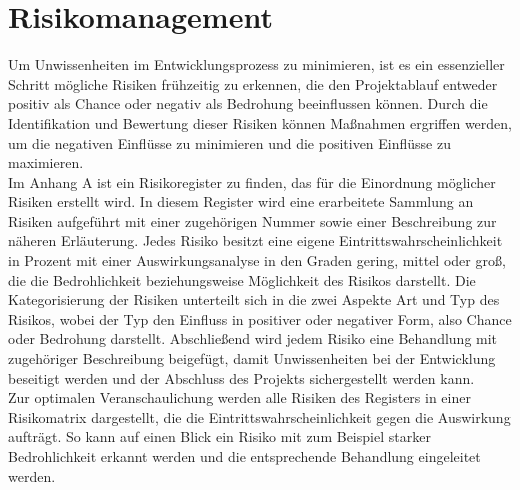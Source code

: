 \chapter{Risikomanagement}\label{ch:risikomanagement}
Um Unwissenheiten im Entwicklungsprozess zu minimieren, ist es ein essenzieller Schritt mögliche Risiken frühzeitig 
zu erkennen, die den Projektablauf entweder positiv als Chance oder negativ als Bedrohung beeinflussen können.
Durch die Identifikation und Bewertung dieser Risiken können Maßnahmen ergriffen werden, um die negativen
Einflüsse zu minimieren und die positiven Einflüsse zu maximieren. \\
\newline
Im Anhang A ist ein Risikoregister zu finden, das für die Einordnung möglicher Risiken erstellt wird. 
In diesem Register wird eine erarbeitete Sammlung an Risiken aufgeführt mit einer zugehörigen Nummer sowie einer
Beschreibung zur näheren Erläuterung.
Jedes Risiko besitzt eine eigene Eintrittswahrscheinlichkeit in Prozent mit einer Auswirkungsanalyse in den Graden 
gering, mittel oder groß, die die Bedrohlichkeit beziehungsweise Möglichkeit des Risikos darstellt.
Die Kategorisierung der Risiken unterteilt sich in die zwei Aspekte Art und Typ des Risikos, wobei der Typ den Einfluss
in positiver oder negativer Form, also Chance oder Bedrohung darstellt.
Abschließend wird jedem Risiko eine Behandlung mit zugehöriger Beschreibung beigefügt, damit Unwissenheiten bei der 
Entwicklung beseitigt werden und der Abschluss des Projekts sichergestellt werden kann. \\
\newline
Zur optimalen Veranschaulichung werden alle Risiken des Registers in einer Risikomatrix dargestellt, die die
Eintrittswahrscheinlichkeit gegen die Auswirkung aufträgt.
So kann auf einen Blick ein Risiko mit zum Beispiel starker Bedrohlichkeit erkannt werden und die entsprechende 
Behandlung eingeleitet werden. \\